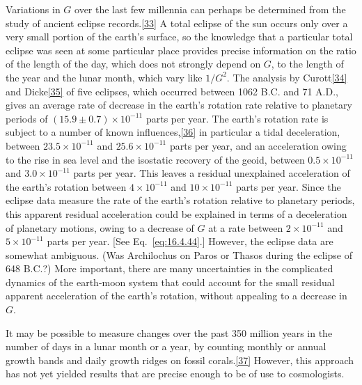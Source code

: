 Variations in \(G\) over the last few millennia can perhaps be determined from
the study of ancient eclipse records.\hyperref[ch16-ref-33]{[33]} A total
eclipse of the sun occurs only over a very small portion of the earth's surface,
so the knowledge that a particular total eclipse was seen at some particular
place provides precise information on the ratio of the length of the day, which
does not strongly depend on \(G\), to the length of the year and the lunar
month, which vary like \(1/G^2\). The analysis by
Curott\hyperref[ch16-ref-34]{[34]} and Dicke\hyperref[ch16-ref-35]{[35]} of
five eclipses, which occurred between 1062 B.C. and 71 A.D., gives an average
rate of decrease in the earth's rotation rate relative to planetary periods of
\((15.9\pm0.7)\times10^{-11}\) parts per year. The earth's rotation rate is
subject to a number of known influences,\hyperref[ch16-ref-36]{[36]} in
particular a tidal deceleration, between \(23.5\times10^{-11}\) and
\(25.6\times10^{-11}\) parts per year, and an acceleration owing to the rise
in sea level and the isostatic recovery of the geoid, between
\(0.5\times10^{-11}\) and \(3.0\times10^{-11}\) parts per year. This leaves
a residual unexplained acceleration of the earth's rotation between
\(4\times10^{-11}\) and \(10\times10^{-11}\) parts per year. Since the
eclipse data measure the rate of the earth's rotation relative to planetary
periods, this apparent residual acceleration could be explained in terms of a
deceleration of planetary motions, owing to a decrease of \(G\) at a rate
between \(2\times10^{-11}\) and \(5\times10^{-11}\) parts per year. [See
Eq.~\eqref{eq:16.4.44}.] However, the eclipse data are somewhat ambiguous.
(Was Archilochus on Paros or Thasos during the eclipse of 648 B.C.?) More
important, there are many uncertainties in the complicated dynamics of the
earth-moon system that could account for the small residual apparent
acceleration of the earth's rotation, without appealing to a decrease in
\(G\).

It may be possible to measure changes over the past 350 million years in the
number of days in a lunar month or a year, by counting monthly or annual growth
bands and daily growth ridges on fossil
corals.\hyperref[ch16-ref-37]{[37]} However, this approach has not yet yielded
results that are precise enough to be of use to cosmologists.

